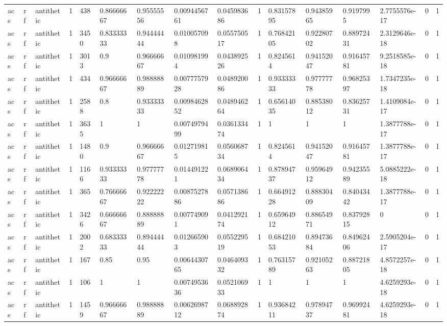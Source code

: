 \begin{tabular}{llllllllllllllll}
acs & rf & antithetic & 1 & 438 & 0.86666667 & 0.95555556 & 0.0094456761 & 0.045983686 & 1 & 0.83157895 & 0.94385965 & 0.9197995 & 2.7755576e-17 & 0 & 1 \\
acs & rf & antithetic & 1 & 3450 & 0.83333333 & 0.94444444 & 0.010057098 & 0.055750517 & 1 & 0.76842105 & 0.92280702 & 0.88972431 & 2.3129646e-18 & 0 & 1 \\
acs & rf & antithetic & 1 & 3013 & 0.9 & 0.96666667 & 0.010981994 & 0.043892526 & 1 & 0.8245614 & 0.94152047 & 0.91645781 & 9.2518585e-18 & 0 & 1 \\
acs & rf & antithetic & 1 & 434 & 0.96666667 & 0.98888889 & 0.0077757928 & 0.048920086 & 1 & 0.93333333 & 0.97777778 & 0.96825397 & 1.7347235e-18 & 0 & 1 \\
acs & rf & antithetic & 1 & 2588 & 0.8 & 0.93333333 & 0.0098462852 & 0.048946264 & 1 & 0.65614035 & 0.88538012 & 0.83625731 & 1.4109084e-17 & 0 & 1 \\
acs & rf & antithetic & 1 & 3635 & 1 & 1 & 0.0074979499 & 0.036133474 & 1 & 1 & 1 & 1 & 1.3877788e-17 & 0 & 1 \\
acs & rf & antithetic & 1 & 1480 & 0.9 & 0.96666667 & 0.012719815 & 0.056068734 & 1 & 0.8245614 & 0.94152047 & 0.91645781 & 1.3877788e-17 & 0 & 1 \\
acs & rf & antithetic & 1 & 1166 & 0.93333333 & 0.97777778 & 0.014491221 & 0.068906434 & 1 & 0.87894737 & 0.95964912 & 0.94235589 & 5.0885222e-18 & 0 & 1 \\
acs & rf & antithetic & 1 & 365 & 0.76666667 & 0.92222222 & 0.0087527886 & 0.057138686 & 1 & 0.66491228 & 0.88830409 & 0.84043442 & 1.3877788e-17 & 0 & 1 \\
acs & rf & antithetic & 1 & 3426 & 0.66666667 & 0.88888889 & 0.007749091 & 0.041292174 & 1 & 0.65964912 & 0.88654971 & 0.83792815 & 0 & 0 & 1 \\
acs & rf & antithetic & 1 & 2002 & 0.68333333 & 0.89444444 & 0.012665903 & 0.055229519 & 1 & 0.68421053 & 0.89473684 & 0.84962406 & 2.5905204e-17 & 0 & 1 \\
acs & rf & antithetic & 1 & 167 & 0.85 & 0.95 & 0.0064430765 & 0.046409332 & 1 & 0.76315789 & 0.92105263 & 0.88721805 & 4.8572257e-18 & 0 & 1 \\
acs & rf & antithetic & 1 & 106 & 1 & 1 & 0.0074953636 & 0.052106933 & 1 & 1 & 1 & 1 & 4.6259293e-18 & 0 & 1 \\
acs & rf & antithetic & 1 & 1459 & 0.96666667 & 0.98888889 & 0.0062698712 & 0.068892874 & 1 & 0.93684211 & 0.97894737 & 0.96992481 & 4.6259293e-18 & 0 & 1 \\

\end{tabular}
